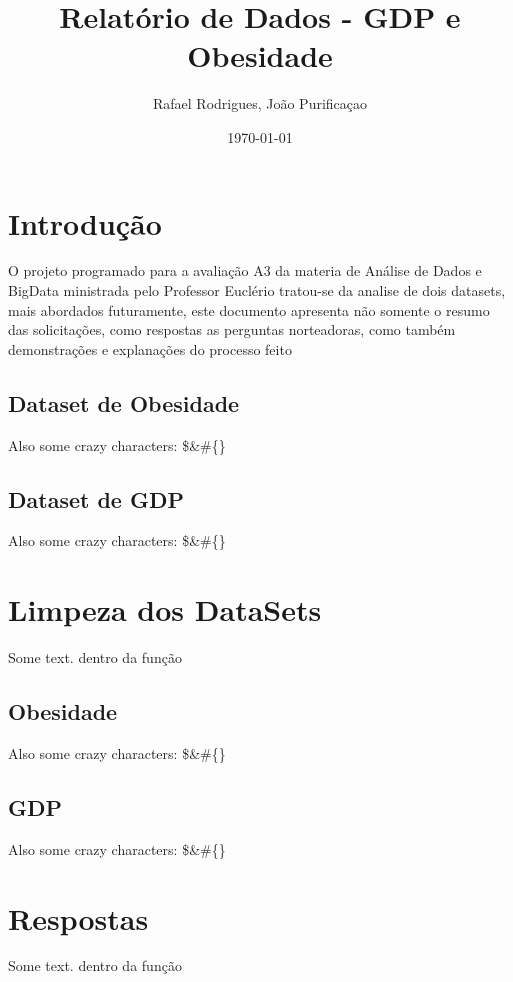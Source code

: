 \documentclass{article}%
\title{Relatório de Dados {-} GDP e Obesidade}%
\author{Rafael Rodrigues, João Purificaçao}%
\date{\today}%
\begin{document}
%
\normalsize%
\maketitle%
\section{Introdução}%
\label{sec:Introduo}%
\newline%
    O projeto programado para a avaliação A3 da materia de Análise de Dados e BigData ministrada pelo Professor Euclério tratou{-}se da analise de dois datasets, mais abordados futuramente, este documento apresenta não somente o resumo das solicitações, como respostas as perguntas norteadoras, como também demonstrações e explanações do processo feito\newline%
\subsection{Dataset de Obesidade}%
\label{subsec:DatasetdeObesidade}%
Also some crazy characters: \$\&\#\{\}

%
\subsection{Dataset de GDP}%
\label{subsec:DatasetdeGDP}%
Also some crazy characters: \$\&\#\{\}

%
\section{Limpeza dos DataSets}%
\label{sec:LimpezadosDataSets}%
Some text. dentro da função%
\subsection{Obesidade}%
\label{subsec:Obesidade}%
Also some crazy characters: \$\&\#\{\}

%
\subsection{GDP}%
\label{subsec:GDP}%
Also some crazy characters: \$\&\#\{\}

%
\section{Respostas}%
\label{sec:Respostas}%
Some text. dentro da função

%
\end{document}
